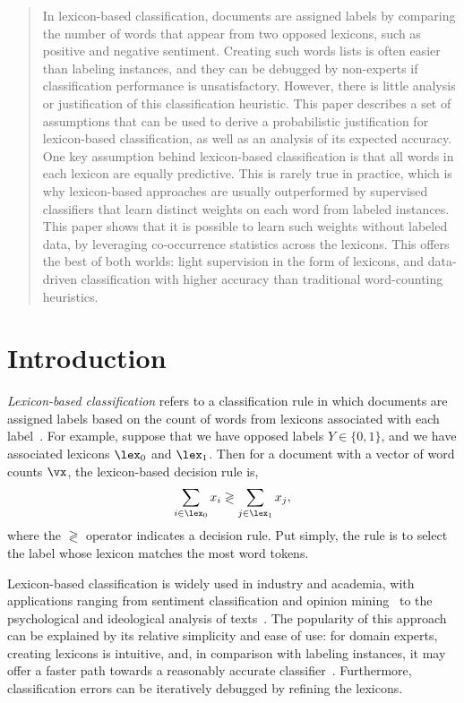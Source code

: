 \begin{abstract}
In lexicon-based classification, documents are assigned labels by  comparing the number of words that appear from two opposed lexicons, such as positive and negative sentiment. Creating such words lists is often easier than labeling instances, and they can be debugged by non-experts if classification performance is unsatisfactory. However, there is little analysis or justification of this classification heuristic. This paper describes a set of assumptions that can be used to derive a probabilistic justification for lexicon-based classification, as well as an analysis of its expected accuracy. One key assumption behind lexicon-based classification is that all words in each lexicon are equally predictive. This is rarely true in practice, which is why lexicon-based approaches are usually outperformed by supervised classifiers that learn distinct weights on each word from labeled instances. This paper shows that it is possible to learn such weights without labeled data, by leveraging co-occurrence statistics across the lexicons. This offers the best of both worlds: light supervision in the form of lexicons, and data-driven classification with higher accuracy than traditional word-counting heuristics.
\end{abstract}

\section{Introduction}
\emph{Lexicon-based classification} refers to a classification rule in which documents are assigned labels based on the count of words from lexicons associated with each label~\cite{taboada2011lexicon}. For example, suppose that we have opposed labels $Y \in \{0,1\}$, and we have associated lexicons $\lex_0$ and $\lex_1$. Then for a document with a vector of word counts $\vx$, the lexicon-based decision rule is,
\begin{dmath}
\label{eq:lexicon-decision-rule}
\sum_{i \in \lex_0} x_i \gtrless \sum_{j \in \lex_1} x_j,
\end{dmath}
where the $\gtrless$ operator indicates a decision rule. Put simply, the rule is to select the label whose lexicon matches the most word tokens.

Lexicon-based classification is widely used in industry and academia, with applications ranging from sentiment classification and opinion mining~\cite{pang2008opinion,liu2015sentiment} to the psychological and ideological analysis of texts~\cite{laver2000estimating,tausczik2010psychological}. %
The popularity of this approach can be explained by its relative simplicity and ease of use: for domain experts, creating lexicons is intuitive, and, in comparison with labeling instances, it may offer a faster path towards a reasonably accurate classifier~\cite{settles2011closing}. Furthermore, classification errors can be iteratively debugged by refining the lexicons.

